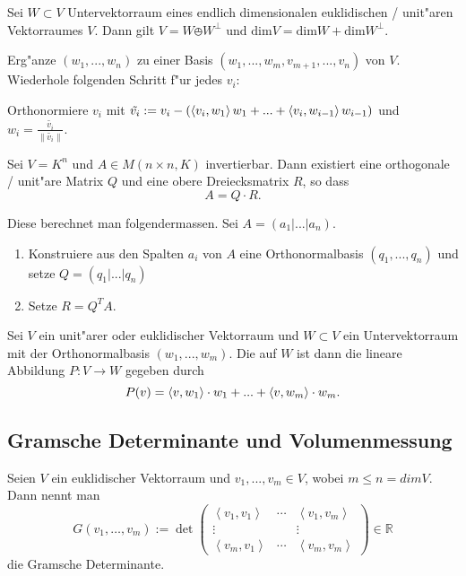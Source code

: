 \documentclass[9pt, a4paper, twocolumn, landscape]{article}
\begin{document}
\begin{corollary}
Sei $W \subset V$  Untervektorraum eines endlich dimensionalen euklidischen / unit"aren Vektorraumes $V$. Dann gilt
$
V = W \obot W^\perp \text{ und } \mathrm{dim} V = \mathrm{dim} W + \mathrm{dim} W^\perp.
$
\end{corollary}

\begin{remark}
Erg"anze $(w_1, ..., w_n)$ zu einer Basis $(w_1, ..., w_m, v_{m+1}, ..., v_n)$ von $V$. Wiederhole folgenden Schritt f"ur jedes $v_i$:

Orthonormiere $v_i$ mit $\tilde{v_i} := v_i - \left( \left\langle {v_i} , {w_1} \right\rangle  w_1 +  ...  + \left\langle {v_i} , {w_{i-1}} \right\rangle w_{i-1}  \right)$ und $w_i = \frac{\tilde{v_i}}{\|\tilde{v_i}\|}.$
\end{remark}

\begin{remark} 
Sei $V = K^n$ und $A \in M(n \times n, K)$ invertierbar. Dann existiert eine orthogonale / unit"are Matrix  $Q$ und eine obere Dreiecksmatrix $R$, so dass $$
A = Q \cdot R.$$

Diese berechnet man folgendermassen. Sei $A = (a_1 | ... |a_n)$.
\begin{enumerate}
\item Konstruiere aus den Spalten $a_i$ von $A$ eine Orthonormalbasis $(q_1, ..., q_n)$ und setze $Q = (q_1| ...|q_n)$
\item Setze $R = Q^T A$.
\end{enumerate}
\end{remark}


\begin{definition}
Sei $V$ ein unit"arer oder euklidischer Vektorraum und $W \subset V$ ein Untervektorraum mit der Orthonormalbasis $(w_1, ..., w_m)$.
Die  auf $W$ ist dann die lineare Abbildung $P : V \rightarrow W$ gegeben durch 
$$P(v) = \left\langle {v} , {w_1} \right\rangle \cdot w_1 + ... + \left\langle {v} , {w_m} \right\rangle\cdot w_m.$$
\end{definition}
\subsection{Gramsche Determinante und Volumenmessung}

\begin{definition}
Seien $V$ ein euklidischer Vektorraum und $v_1, ..., v_m \in V$, wobei $m \leq n = dim V$.
Dann nennt man 
$$
G\left(v_{1}, \ldots, v_{m}\right):=\operatorname{det}\left(\begin{array}{ccc}\left\langle v_{1}, v_{1}\right\rangle & \cdots & \left\langle v_{1}, v_{m}\right\rangle \\ \vdots & & \vdots \\ \left\langle v_{m}, v_{1}\right\rangle & \cdots & \left\langle v_{m}, v_{m}\right\rangle\end{array}\right) \in \mathbb{R}
$$
die Gramsche Determinante.
\end{definition}
\end{document}

